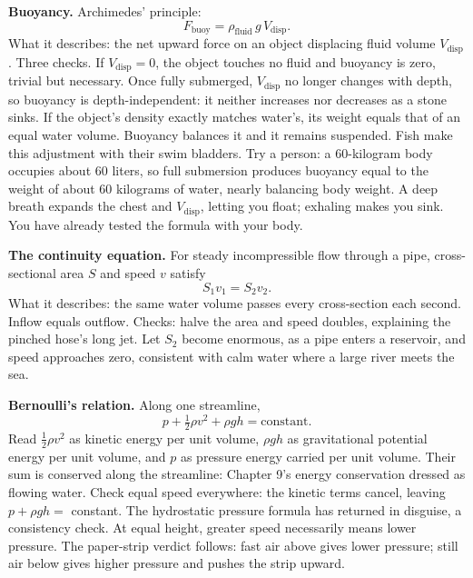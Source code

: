 \begin{mainline}
\textbf{Buoyancy.} Archimedes' principle:
\[
  F_{\text{buoy}} = \rho_{\text{fluid}}\, g\, V_{\text{disp}} .
\]
What it describes: the net upward force on an object displacing fluid volume \(V_{\text{disp}}\). Three checks. If \(V_{\text{disp}}=0\), the object touches no fluid and buoyancy is zero, trivial but necessary. Once fully submerged, \(V_{\text{disp}}\) no longer changes with depth, so buoyancy is depth-independent: it neither increases nor decreases as a stone sinks. If the object's density exactly matches water's, its weight equals that of an equal water volume. Buoyancy balances it and it remains suspended. Fish make this adjustment with their swim bladders. Try a person: a \(60\)-kilogram body occupies about \(60\) liters, so full submersion produces buoyancy equal to the weight of about \(60\) kilograms of water, nearly balancing body weight. A deep breath expands the chest and \(V_{\text{disp}}\), letting you float; exhaling makes you sink. You have already tested the formula with your body.

\textbf{The continuity equation.} For steady incompressible flow through a pipe, cross-sectional area \(S\) and speed \(v\) satisfy
\[
  S_{1}v_{1} = S_{2}v_{2} .
\]
What it describes: the same water volume passes every cross-section each second. Inflow equals outflow. Checks: halve the area and speed doubles, explaining the pinched hose's long jet. Let \(S_{2}\) become enormous, as a pipe enters a reservoir, and speed approaches zero, consistent with calm water where a large river meets the sea.

\textbf{Bernoulli's relation.} Along one streamline,
\[
  p + \tfrac{1}{2}\rho v^{2} + \rho g h = \text{constant}.
\]
Read \(\tfrac{1}{2}\rho v^{2}\) as kinetic energy per unit volume, \(\rho g h\) as gravitational potential energy per unit volume, and \(p\) as pressure energy carried per unit volume. Their sum is conserved along the streamline: Chapter 9's energy conservation dressed as flowing water. Check equal speed everywhere: the kinetic terms cancel, leaving \(p+\rho g h=\) constant. The hydrostatic pressure formula has returned in disguise, a consistency check. At equal height, greater speed necessarily means lower pressure. The paper-strip verdict follows: fast air above gives lower pressure; still air below gives higher pressure and pushes the strip upward.
\end{mainline}

